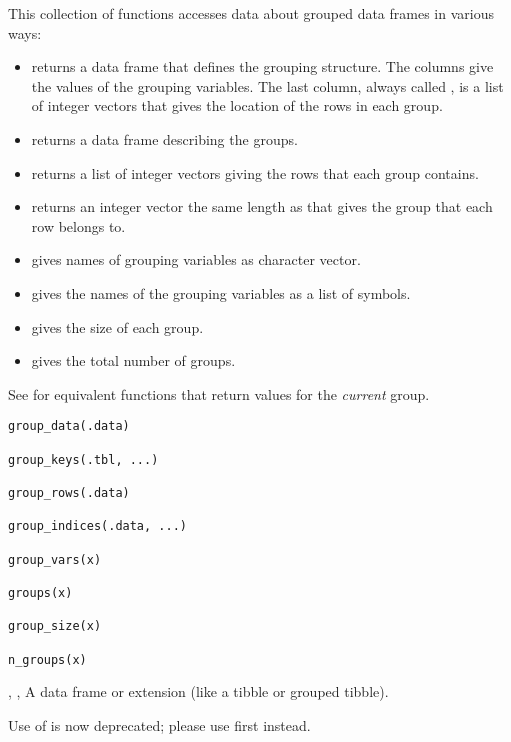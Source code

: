 \documentclass[a4paper]{book}
\begin{document}
\begin{Description}
This collection of functions accesses data about grouped data frames in
various ways:
\begin{itemize}

\item{}  returns a data frame that defines the grouping structure.
The columns give the values of the grouping variables. The last column,
always called , is a list of integer vectors that gives the
location of the rows in each group.
\item{}  returns a data frame describing the groups.
\item{}  returns a list of integer vectors giving the rows that
each group contains.
\item{}  returns an integer vector the same length as 
that gives the group that each row belongs to.
\item{}  gives names of grouping variables as character vector.
\item{}  gives the names of the grouping variables as a list of symbols.
\item{}  gives the size of each group.
\item{}  gives the total number of groups.

\end{itemize}


See  for equivalent functions that return values for the \emph{current}
group.
\end{Description}
%
\begin{Usage}
\begin{verbatim}
group_data(.data)

group_keys(.tbl, ...)

group_rows(.data)

group_indices(.data, ...)

group_vars(x)

groups(x)

group_size(x)

n_groups(x)
\end{verbatim}
\end{Usage}
%
\begin{Arguments}
\begin{ldescription}
\item[\code{.data}, \code{.tbl}, \code{x}] A data frame or extension (like a tibble or grouped
tibble).

\item[\code{...}] Use of  is now deprecated; please use  first
instead.
\end{ldescription}
\end{Arguments}
\end{document}
